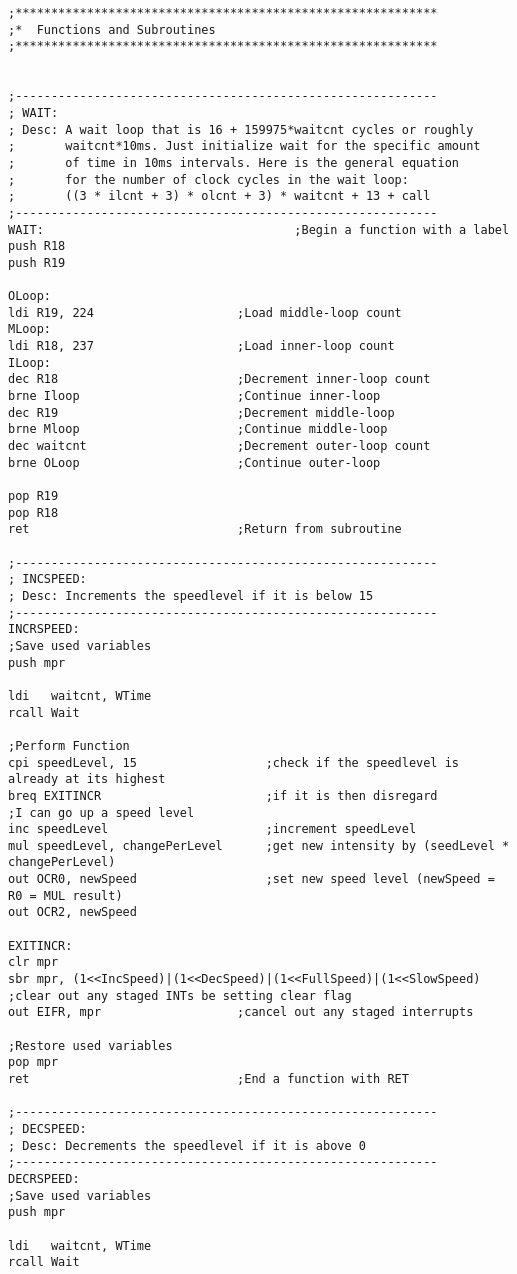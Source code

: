 \documentclass[12pt,letterpaper]{article}
\begin{document}
\begin{verbatim}
;***********************************************************
;*	Functions and Subroutines
;***********************************************************


;-----------------------------------------------------------
; WAIT: 
; Desc: A wait loop that is 16 + 159975*waitcnt cycles or roughly
; 		waitcnt*10ms. Just initialize wait for the specific amount
; 		of time in 10ms intervals. Here is the general equation
; 		for the number of clock cycles in the wait loop:
;		((3 * ilcnt + 3) * olcnt + 3) * waitcnt + 13 + call
;-----------------------------------------------------------
WAIT:									;Begin a function with a label
push R18
push R19 

OLoop:
ldi R19, 224					;Load middle-loop count
MLoop:
ldi R18, 237  					;Load inner-loop count
ILoop:
dec R18  						;Decrement inner-loop count
brne Iloop 						;Continue inner-loop
dec R19 	 					;Decrement middle-loop
brne Mloop 						;Continue middle-loop
dec waitcnt 	 				;Decrement outer-loop count
brne OLoop 						;Continue outer-loop

pop R19
pop R18
ret 							;Return from subroutine

;-----------------------------------------------------------
; INCSPEED: 
; Desc:	Increments the speedlevel if it is below 15
;-----------------------------------------------------------
INCRSPEED:	
;Save used variables
push mpr

ldi   waitcnt, WTime
rcall Wait

;Perform Function
cpi speedLevel, 15					;check if the speedlevel is already at its highest
breq EXITINCR						;if it is then disregard
;I can go up a speed level
inc speedLevel						;increment speedLevel	
mul speedLevel, changePerLevel		;get new intensity by (seedLevel * changePerLevel)
out OCR0, newSpeed					;set new speed level (newSpeed = R0 = MUL result)
out OCR2, newSpeed

EXITINCR:
clr mpr
sbr mpr, (1<<IncSpeed)|(1<<DecSpeed)|(1<<FullSpeed)|(1<<SlowSpeed) ;clear out any staged INTs be setting clear flag
out EIFR, mpr					;cancel out any staged interrupts

;Restore used variables
pop mpr
ret								;End a function with RET

;-----------------------------------------------------------
; DECSPEED: 
; Desc:	Decrements the speedlevel if it is above 0
;-----------------------------------------------------------
DECRSPEED:	
;Save used variables
push mpr

ldi   waitcnt, WTime
rcall Wait


\end{verbatim}
\end{document}

